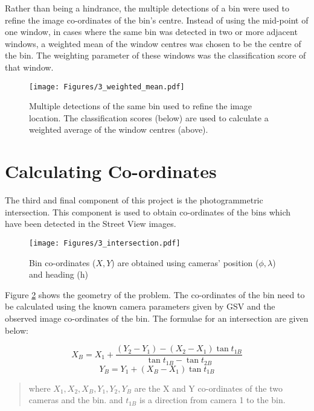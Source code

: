 Rather than being a hindrance, the multiple detections of a bin were used to refine the image co-ordinates of the bin's centre. Instead of using the mid-point of one window, in cases where the same bin was detected in two or more adjacent windows, a weighted mean of the window centres was chosen to be the centre of the bin. The weighting parameter of these windows was the classification score of that window.

\begin{figure}[H]
\centering
\texttt{[image: Figures/3\_weighted\_mean.pdf]}
\decoRule
\caption[Weighted Mean]{Multiple detections of the same bin used to refine the image location. The classification scores (below) are used to calculate a weighted average of the window centres (above).}
\label{fig:multiple_detections}
\end{figure}

\section{Calculating Co-ordinates}
The third and final component of this project is the photogrammetric intersection. This component is used to obtain co-ordinates of the bins which have been detected in the Street View images.

\begin{figure}[!ht]
\centering
\texttt{[image: Figures/3\_intersection.pdf]}
\decoRule
\caption[Photogrammetric Intersection]{Bin co-ordinates ($X, Y$) are obtained using cameras' position ($\phi, \lambda$) and heading (h)}
\label{fig:intersection2}
\end{figure}

Figure \ref{fig:intersection2} shows the geometry of the problem. The co-ordinates of the bin need to be calculated using the known camera parameters given by GSV and the observed image co-ordinates of the bin. The formulae for an intersection are given below:

\begin{equation}\label{eq:intersection1}
    X_B = X_1 + \dfrac{(Y_2 - Y_1) - (X_2 - X_1)\tan{t_{1B}}}{\tan{t_{1B}} - \tan{t_{2B}}}
\end{equation}
\begin{equation}\label{eq:intersection2}
    Y_B = Y_1 + (X_B - X_1)\tan{t_{1B}}
\end{equation}

\begin{quote}
    where $X_1, X_2, X_B, Y_1, Y_2, Y_B$ are the X and Y co-ordinates of the two cameras and the bin.
    and $t_{1B}$ is a direction from camera 1 to the bin.
\end{quote}

